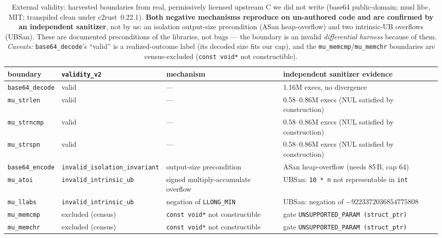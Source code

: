 \begin{table}[t]
  \centering
  \caption{External validity: harvested boundaries from real, permissively
    licensed upstream C we did not write (base64 public-domain; musl libc, MIT;
    transpiled clean under c2rust~0.22.1). \textbf{Both negative mechanisms
    reproduce on un-authored code and are confirmed by an independent sanitizer},
    not by us: an isolation output-size precondition (ASan heap-overflow) and two
    intrinsic-UB overflows (UBSan). These are documented preconditions of the
    libraries, not bugs --- the boundary is an invalid \emph{differential harness}
    because of them. \emph{Caveats:} \texttt{base64\_decode}'s ``valid'' is a
    realized-outcome label (its decoded size fits our cap), and the
    \texttt{mu\_memcmp}/\texttt{mu\_memchr} boundaries are census-excluded
    (\texttt{const void*} not constructible).}
  \label{tab:external-validity}
  \begin{tabular}{llll}
    \toprule
    boundary & \texttt{validity\_v2} & mechanism & independent sanitizer evidence \\
    \midrule
    \texttt{base64\_decode}                 & valid & ---
      & 1.16M execs, no divergence \\
    \texttt{mu\_strlen}                      & valid & ---
      & 0.58--0.86M execs (NUL satisfied by construction) \\
    \texttt{mu\_strncmp}                     & valid & ---
      & 0.58--0.86M execs (NUL satisfied by construction) \\
    \texttt{mu\_strspn}                      & valid & ---
      & 0.58--0.86M execs (NUL satisfied by construction) \\
    \texttt{base64\_encode} & \texttt{invalid\_isolation\_invariant} & output-size precondition
      & ASan heap-overflow (needs 85\,B, cap 64) \\
    \texttt{mu\_atoi}       & \texttt{invalid\_intrinsic\_ub} & signed multiply-accumulate overflow
      & UBSan: \texttt{10 * n} not representable in \texttt{int} \\
    \texttt{mu\_llabs}      & \texttt{invalid\_intrinsic\_ub} & negation of \texttt{LLONG\_MIN}
      & UBSan: negation of $-9223372036854775808$ \\
    \texttt{mu\_memcmp}     & excluded (census) & \texttt{const void*} not constructible
      & gate \texttt{UNSUPPORTED\_PARAM (struct\_ptr)} \\
    \texttt{mu\_memchr}     & excluded (census) & \texttt{const void*} not constructible
      & gate \texttt{UNSUPPORTED\_PARAM (struct\_ptr)} \\
    \bottomrule
  \end{tabular}
\end{table}



